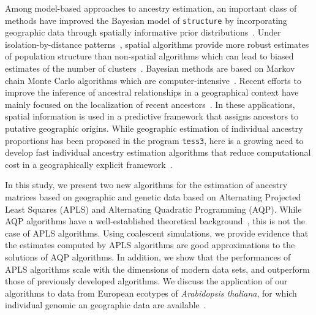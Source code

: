   Among model-based approaches to ancestry estimation, an important class of methods have improved the Bayesian model of {\tt structure} by incorporating geographic data through spatially informative prior distributions~\citep{Chen2007, Corander2008}. Under isolation-by-distance patterns~\citep{Wright1943, Malecot1948}, spatial algorithms provide more robust estimates of population structure than non-spatial algorithms which can lead to biased estimates of the number of clusters~\citep{Durand2009}.  Bayesian methods are based on Markov chain Monte Carlo algorithms which are computer-intensive~\citep{Francois2010}. Recent efforts to improve the inference of ancestral relationships in a geographical context have mainly focused on the localization of recent ancestors~\citep{Baran2013, Lao2014, Yang2014}. In these applications, spatial information is used in a predictive framework that assigns ancestors to putative geographic origins.  While geographic estimation of individual ancestry proportions has been proposed in the program {\tt tess3}, here is a growing need to develop fast individual ancestry estimation algorithms that reduce computational cost in a geographically explicit framework~\citep{Caye2016}. 

In this study, we present two new algorithms for the estimation of ancestry matrices based on geographic and genetic data based on Alternating Projected Least Squares (APLS) and Alternating Quadratic Programming  (AQP). While AQP algorithms have a well-established theoretical background~\citep{Bertsekas1995}, this is not the case of APLS algorithms. Using coalescent simulations, we provide evidence that the estimates computed by APLS algorithms are good approximations to the solutions of AQP algorithms. In addition, we show that the performances of APLS algorithms scale with the dimensions of modern data sets, and outperform those of previously developed algorithms. We discuss the application of our algorithms to data from European ecotypes of {\it Arabidopsis thaliana}, for which individual genomic an geographic data are available~\citep{Horton2012}. 



